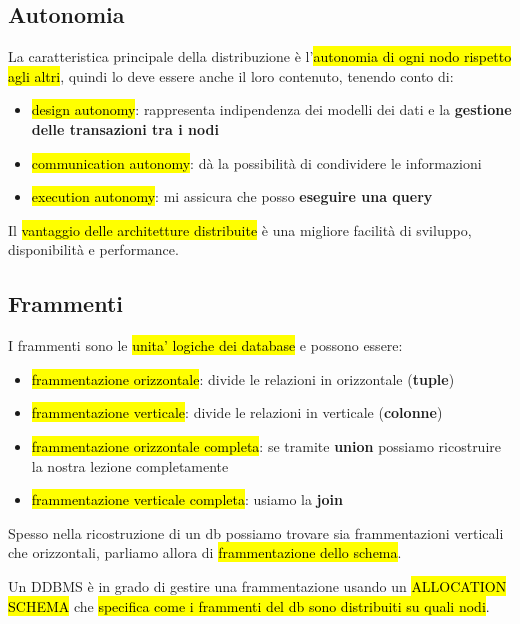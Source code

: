 \subsection{Autonomia}

La caratteristica principale della distribuzione è l'\hl{autonomia di ogni nodo rispetto agli altri}, quindi lo deve essere anche il loro contenuto, tenendo conto di:

\begin{itemize}
    \item \hl{design autonomy}: rappresenta indipendenza dei modelli dei dati e la \textbf{gestione delle transazioni tra i nodi}
    \item \hl{communication autonomy}: dà la possibilità di condividere le informazioni
    \item \hl{execution autonomy}: mi assicura che posso \textbf{eseguire una query}
\end{itemize}

Il \hl{vantaggio delle architetture distribuite} è una migliore facilità di sviluppo, disponibilità e performance.


\subsection{Frammenti}

I frammenti sono le \hl{unita' logiche dei database} e possono essere:

\begin{itemize}
    \item \hl{frammentazione orizzontale}: divide le relazioni in orizzontale (\textbf{tuple})
    \item \hl{frammentazione verticale}: divide le relazioni in verticale (\textbf{colonne})
    \item \hl{frammentazione orizzontale completa}: se tramite \textbf{union} possiamo ricostruire la nostra lezione completamente
    \item \hl{frammentazione verticale completa}: usiamo la \textbf{join}
\end{itemize}

Spesso nella ricostruzione di un db possiamo trovare sia frammentazioni verticali che orizzontali, parliamo allora di \hl{frammentazione dello schema}.

Un DDBMS è in grado di gestire una frammentazione usando un \hl{ALLOCATION SCHEMA} che \hl{specifica come i frammenti del db sono distribuiti su quali nodi}.

